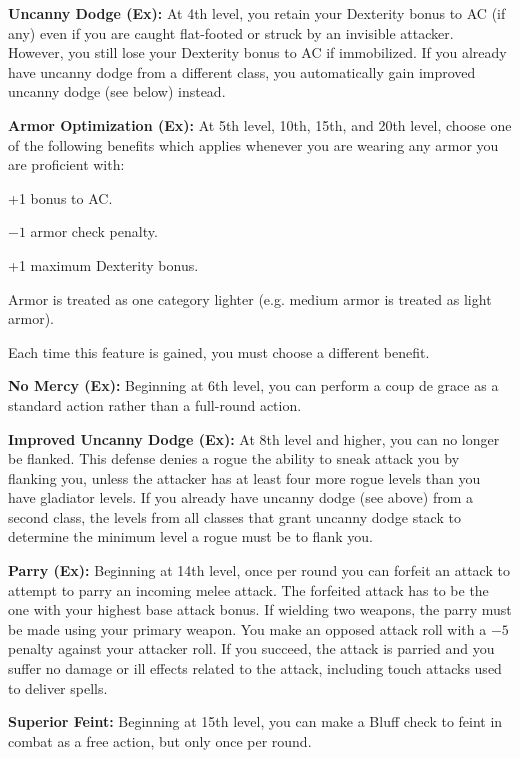 \textbf{Uncanny Dodge (Ex):} At 4th level, you retain your Dexterity bonus to AC (if any) even if you are caught flat-footed or struck by an invisible attacker. However, you still lose your Dexterity bonus to AC if immobilized. If you already have uncanny dodge from a different class, you automatically gain improved uncanny dodge (see below) instead.

\textbf{Armor Optimization (Ex):} At 5th level, 10th, 15th, and 20th level, choose one of the following benefits which applies whenever you are wearing any armor you are proficient with:

\begin{itemize*}
\item +1 bonus to AC.
\item $-1$ armor check penalty.
\item +1 maximum Dexterity bonus.
\item Armor is treated as one category lighter (e.g. medium armor is treated as light armor).
\end{itemize*}

Each time this feature is gained, you must choose a different benefit.

\textbf{No Mercy (Ex):} Beginning at 6th level, you can perform a coup de grace as a standard action rather than a full-round action.

\textbf{Improved Uncanny Dodge (Ex):} At 8th level and higher, you can no longer be flanked. This defense denies a rogue the ability to sneak attack you by flanking you, unless the attacker has at least four more rogue levels than you have gladiator levels. If you already have uncanny dodge (see above) from a second class, the levels from all classes that grant uncanny dodge stack to determine the minimum level a rogue must be to flank you.

\textbf{Parry (Ex):} Beginning at 14th level, once per round you can forfeit an attack to attempt to parry an incoming melee attack. The forfeited attack has to be the one with your highest base attack bonus. If wielding two weapons, the parry must be made using your primary weapon. You make an opposed attack roll with a $-5$ penalty against your attacker roll. If you succeed, the attack is parried and you suffer no damage or ill effects related to the attack, including touch attacks used to deliver spells.

\textbf{Superior Feint:} Beginning at 15th level, you can make a Bluff check to feint in combat as a free action, but only once per round.

